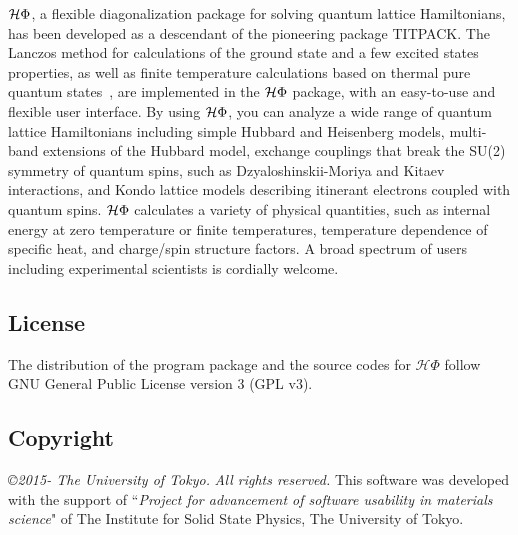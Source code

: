 $\mathcal{H} \Phi$, a flexible diagonalization package for solving quantum lattice Hamiltonians,
has been developed as a descendant of the pioneering package TITPACK.
The Lanczos method for calculations of the ground state and a few excited states properties,
as well as finite temperature calculations based on thermal pure quantum states~\cite{Sugiura2012},
are implemented in
the $\mathcal{H} \Phi$ package, with an easy-to-use and flexible user interface.
By using $\mathcal{H} \Phi$, you can analyze a wide range of quantum lattice Hamiltonians including
simple Hubbard and Heisenberg models, multi-band extensions of the Hubbard model,
exchange couplings that break the SU(2) symmetry of quantum spins, such as Dzyaloshinskii-Moriya
and Kitaev interactions, and Kondo lattice models describing itinerant electrons coupled with
quantum spins. $\mathcal{H} \Phi$ calculates a variety of physical quantities, such as internal energy at zero temperature or finite temperatures, temperature dependence of specific heat, and charge/spin structure factors.
A broad spectrum of users including experimental scientists is cordially welcome.

\subsection{License}
The distribution of the program package and the source codes for ${\mathcal H \Phi}$ follow GNU General Public License version 3 (GPL v3). 
\subsection{Copyright}
{\it \copyright 2015- The University of Tokyo.} {\it  All rights reserved.}
This software was developed with the support of ``{\it Project for advancement of software usability in materials science}" of The Institute for Solid State Physics, The University of Tokyo. 
